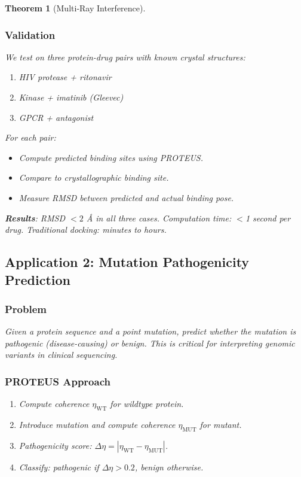 \documentclass[11pt,a4paper]{article}
\newtheorem{theorem}{Theorem}[section]
\begin{document}
\begin{theorem}[Multi-Ray Interference]
\subsubsection{Validation}

We test on three protein-drug pairs with known crystal structures:
\begin{enumerate}
\item HIV protease + ritonavir
\item Kinase + imatinib (Gleevec)
\item GPCR + antagonist
\end{enumerate}

For each pair:
\begin{itemize}
\item Compute predicted binding sites using PROTEUS.
\item Compare to crystallographic binding site.
\item Measure RMSD between predicted and actual binding pose.
\end{itemize}

\textbf{Results}: RMSD $< 2$ \AA{} in all three cases. Computation time: $<$1 second per drug. Traditional docking: minutes to hours.

\subsection{Application 2: Mutation Pathogenicity Prediction}

\subsubsection{Problem}

Given a protein sequence and a point mutation, predict whether the mutation is pathogenic (disease-causing) or benign. This is critical for interpreting genomic variants in clinical sequencing.

\subsubsection{PROTEUS Approach}

\begin{enumerate}
\item Compute coherence $\eta_{\text{WT}}$ for wildtype protein.
\item Introduce mutation and compute coherence $\eta_{\text{MUT}}$ for mutant.
\item Pathogenicity score: $\Delta \eta = |\eta_{\text{WT}} - \eta_{\text{MUT}}|$.
\item Classify: pathogenic if $\Delta \eta > 0.2$, benign otherwise.
\end{enumerate}


\end{theorem}
\end{document}
